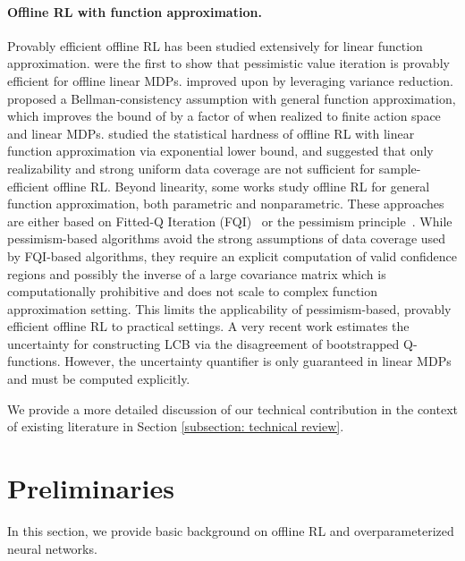 \documentclass{article} \usepackage{iclr2023/iclr2023_conference,times}
\begin{document}
\paragraph{Offline RL with function approximation.} 
Provably efficient offline RL has been studied extensively for linear function approximation. \citet{jin2021pessimism} were the first to show that pessimistic value iteration is provably efficient for offline linear MDPs. \citet{Xiong2022NearlyMO,yinnear} improved upon \citet{jin2021pessimism} by leveraging variance reduction. \citet{xie2021bellman} proposed a Bellman-consistency assumption with general function approximation, which improves the bound of \citet{jin2021pessimism} by a factor of  when realized to finite action space and linear MDPs. \citet{wang2020statistical,zanette2021exponential} studied the statistical hardness of offline RL with linear function approximation via exponential lower bound, and \citet{foster2021offline} suggested that only realizability and strong uniform data coverage are not sufficient for sample-efficient offline RL. Beyond linearity, some works study offline RL for general function approximation, both parametric and nonparametric. These approaches are either based on Fitted-Q Iteration (FQI)~\citep{DBLP:journals/jmlr/MunosS08, DBLP:conf/icml/0002VY19, chen2019information, duan2021risk, duan2021optimal, hu2021fast, nguyentang2021sample} or the pessimism principle~\citep{uehara2021pessimistic,nguyen2021offline,jin2021pessimism}. While pessimism-based algorithms avoid the strong assumptions of data coverage used by FQI-based algorithms, they require an explicit computation of valid confidence regions and possibly the inverse of a large covariance matrix which is computationally prohibitive and does not scale to complex function approximation setting. This limits the applicability of pessimism-based, provably efficient offline RL to practical settings. A very recent work \cite{bai2022pessimistic} estimates the uncertainty for constructing LCB via the disagreement of bootstrapped Q-functions. However, the uncertainty quantifier is only guaranteed in linear MDPs and must be computed explicitly. 

We provide a more detailed discussion of our technical contribution in the context of existing literature in Section \ref{subsection: technical review}.










%
 \section{Preliminaries}
\label{section: preliminary}
In this section, we provide basic background on offline RL and overparameterized neural networks. 
\end{document}
